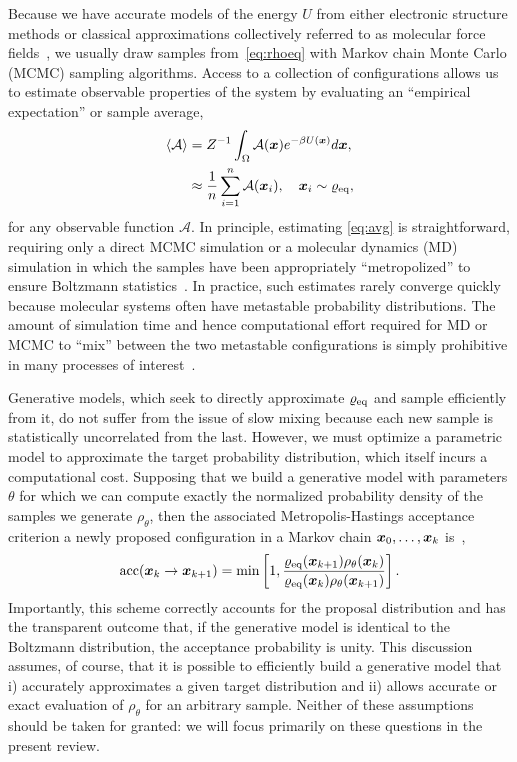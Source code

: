 \documentclass[11pt]{article}
\begin{document}
Because we have accurate models of the energy $U$ from either electronic structure methods or classical approximations collectively referred to as molecular force fields~\cite{case_amber_2005, vanommeslaeghe_charmm_2010}, we usually draw samples from~\eqref{eq:rhoeq} with Markov chain Monte Carlo (MCMC) sampling algorithms.
Access to a collection of configurations allows us to estimate observable properties of the system by evaluating an ``empirical expectation'' or sample average,
\begin{equation}
\begin{aligned}
    \left\langle \mathcal{A} \right\rangle &= Z^{-1} \int_{\Omega} \mathcal{A}(\boldsymbol{x}) e^{-\beta U(\boldsymbol{x})} d\boldsymbol{x}, \\
    &\approx \frac1n \sum_{i=1}^n \mathcal{A}(\boldsymbol{x}_i), \quad \boldsymbol{x}_i \sim \varrho_{\rm eq},
    \label{eq:avg}
\end{aligned}
\end{equation}
for any observable function $\mathcal{A}.$
In principle, estimating \eqref{eq:avg} is straightforward, requiring only a direct MCMC simulation or a molecular dynamics (MD) simulation in which the samples have been appropriately ``metropolized'' to ensure Boltzmann statistics~\cite{frenkel_understanding_2002}. 
In practice, such estimates rarely converge quickly because molecular systems often have metastable probability distributions. 
The amount of simulation time and hence computational effort required for MD or MCMC to ``mix'' between the two metastable configurations is simply prohibitive in many processes of interest~\cite{lelievre_free_2010}.

Generative models, which seek to directly approximate $\varrho_{\rm eq}$ and sample efficiently from it, do not suffer from the issue of slow mixing because each new sample is statistically uncorrelated from the last.
However, we must optimize a parametric model to approximate the target probability distribution, which itself incurs a computational cost.
Supposing that we build a generative model with parameters $\theta$ for which we can compute exactly the normalized probability density of the samples we generate $\rho_{\theta}$, then the associated Metropolis-Hastings acceptance criterion a newly proposed configuration in a Markov chain $\boldsymbol{x}_0, \dots, \boldsymbol{x}_k$ is~\cite{gabrie_adaptive_2022},
\begin{equation}
    \textrm{acc}(\boldsymbol{x}_k \to \boldsymbol{x}_{k+1}) = \min \left[ 1, \frac{\varrho_{\rm eq}(\boldsymbol{x}_{k+1})\rho_{\theta}(\boldsymbol{x}_{k}) }{\varrho_{\rm eq}(\boldsymbol{x}_{k})\rho_{\theta}(\boldsymbol{x}_{k+1}) }\right].
\end{equation}
Importantly, this scheme correctly accounts for the proposal distribution and has the transparent outcome that, if the generative model is identical to the Boltzmann distribution, the acceptance probability is unity. 
This discussion assumes, of course, that it is possible to efficiently build a generative model that i) accurately approximates a given target distribution and ii) allows accurate or exact evaluation of $\rho_{\theta}$ for an arbitrary sample. 
Neither of these assumptions should be taken for granted: we will focus primarily on these questions in the present review.
\end{document}
